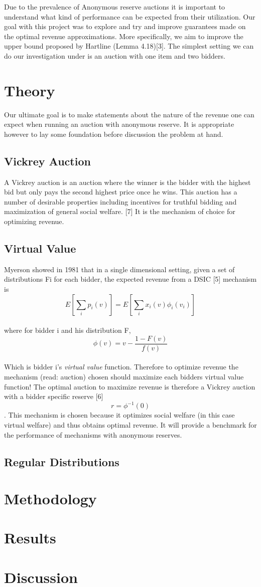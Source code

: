 \documentclass{acm_proc_article-sp}
\begin{document}
Due to the prevalence of Anonymous reserve auctions it is important to understand what kind of performance can be expected from their utilization. Our goal with this project was to explore and try and improve guarantees made on the optimal revenue approximations. More specifically, we aim to improve the upper bound proposed by Hartline (Lemma 4.18)[3]. The simplest setting we can do our investigation under is an auction with one item and two bidders.

\section{Theory}
Our ultimate goal is to make statements about the nature of the revenue one can expect when running an auction with anonymous reserve. It is appropriate however to lay some foundation before discussion the problem at hand.

\subsection{Vickrey Auction}
A Vickrey auction is an auction where the winner is the bidder with the highest bid but only pays the second highest price once he wins. This auction has a number of desirable properties including incentives for truthful bidding and maximization of general social welfare. [7] It is the mechanism of choice for optimizing revenue. 

\subsection{Virtual Value}
Myerson showed in 1981 that in a single dimensional setting, given a set of distributions Fi for each bidder, the expected revenue from a DSIC [5] mechanism is 
\[ E[\sum_{i} p_{i}(v)] = E[\sum_{i} x_{i}(v)\phi_{i}(v_{i})] \] \\
where for bidder i and his distribution F,
\[ \phi(v) = v - \frac{1-F(v)}{f(v)}\] \\
Which is bidder i's \emph{virtual value} function. Therefore to optimize revenue the mechanism (read: auction) chosen should maximize each bidders virtual value function! The optimal auction to maximize revenue is therefore a Vickrey auction with a bidder specific reserve [6] \[ r = \phi^{-1}(0)\]. This mechanism is chosen because it optimizes social welfare (in this case virtual welfare) and thus obtains optimal revenue. It will provide a benchmark for the performance of mechanisms with anonymous reserves.

\subsection{Regular Distributions}


\section{Methodology}

\section{Results}

\section{Discussion}
\end{document}
